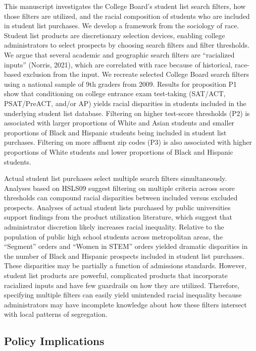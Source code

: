 \documentclass[
  12pt,
]{article}
\begin{document}
This manuscript investigates the College Board's student list search filters, how those filters are utilized, and the racial composition of students who are included in student list purchases. We develop a framework from the sociology of race. Student list products are discretionary selection devices, enabling college administrators to select prospects by choosing search filters and filter thresholds. We argue that several academic and geographic search filters are ``racialized inputs'' (Norris, 2021), which are correlated with race because of historical, race-based exclusion from the input. We recreate selected College Board search filters using a national sample of 9th graders from 2009. Results for proposition P1 show that conditioning on college entrance exam test-taking (SAT/ACT, PSAT/PreACT, and/or AP) yields racial disparities in students included in the underlying student list database. Filtering on higher test-score thresholds (P2) is associated with larger proportions of White and Asian students and smaller proportions of Black and Hispanic students being included in student list purchases. Filtering on more affluent zip codes (P3) is also associated with higher proportions of White students and lower proportions of Black and Hispanic students.

Actual student list purchases select multiple search filters simultaneously. Analyses based on HSLS09 suggest filtering on multiple criteria across score thresholds can compound racial disparities between included versus excluded prospects. Analyses of actual student lists purchased by public universities support findings from the product utilization literature, which suggest that administrator discretion likely increases racial inequality. Relative to the population of public high school students across metropolitan areas, the ``Segment'' orders and ``Women in STEM'' orders yielded dramatic disparities in the number of Black and Hispanic prospects included in student list purchases. These disparities may be partially a function of admissions standards. However, student list products are powerful, complicated products that incorporate racialized inputs and have few guardrails on how they are utilized. Therefore, specifying multiple filters can easily yield unintended racial inequality because administrators may have incomplete knowledge about how these filters intersect with local patterns of segregation.

\hypertarget{policy-implications}{%
\subsection{Policy Implications}\label{policy-implications}}
\end{document}
